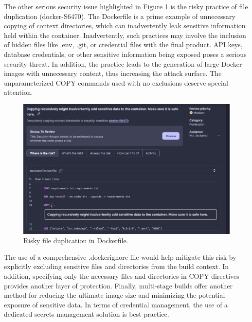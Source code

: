 \documentclass[sigconf]{acmart}
\begin{document}
The other serious security issue highlighted in Figure \ref{fig:figure4} is the risky practice of file duplication (docker-S6470). The Dockerfile is a prime example of unnecessary copying of context directories, which can inadvertently leak sensitive information held within the container. Inadvertently, such practices may involve the inclusion of hidden files like .env, .git, or credential files with the final product. API keys, database credentials, or other sensitive information being exposed poses a serious security threat. In addition, the practice leads to the generation of large Docker images with unnecessary content, thus increasing the attack surface. The unparameterized COPY commands used with no exclusions deserve special attention.

\begin{figure}[htbp]
    \centering
    \includegraphics[width=1\linewidth]{Image2.jpg}
    \caption{Risky file duplication in Dockerfile.}
    \label{fig:figure4}
\end{figure}

The use of a comprehensive .dockerignore file would help mitigate this risk by explicitly excluding sensitive files and directories from the build context. In addition, specifying only the necessary files and directories in COPY directives provides another layer of protection. Finally, multi-stage builds offer another method for reducing the ultimate image size and minimizing the potential exposure of sensitive data. In terms of credential management, the use of a dedicated secrets management solution is best practice.
\end{document}
